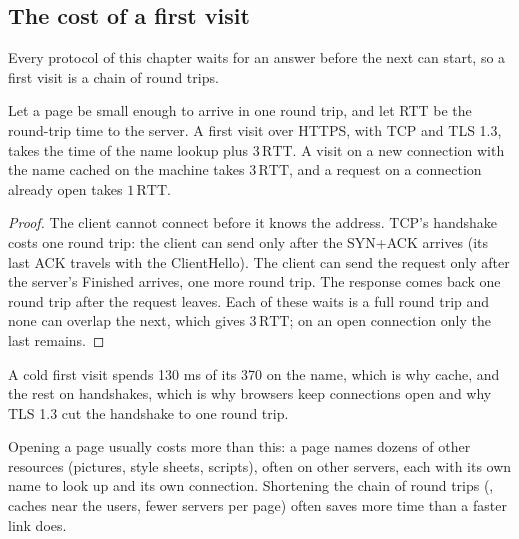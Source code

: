 \subsection{The cost of a first visit}

Every protocol of this chapter waits for an answer before the next can start, so a first visit is a chain of round
trips.

\begin{proposition}\label{prop:b2:application-layer:round-trips}
Let a page be small enough to arrive in one round trip, and let RTT be the round-trip time to the server. A first
visit over HTTPS, with TCP and TLS 1.3, takes the time of the name lookup plus $3\,\mathrm{RTT}$. A visit on a new
connection with the name cached on the machine takes $3\,\mathrm{RTT}$, and a request on a connection already open
takes $1\,\mathrm{RTT}$.
\end{proposition}

\begin{proof}
The client cannot connect before it knows the address. TCP's handshake costs one round trip: the client can send only
after the SYN+ACK arrives (its last ACK travels with the ClientHello). The client can send the request only after the
server's Finished arrives, one more round trip. The response comes back one round trip after the request leaves. Each
of these waits is a full round trip and none can overlap the next, which gives $3\,\mathrm{RTT}$; on an open
connection only the last remains.
\end{proof}

\label{out:b2:application-layer:budget}

A cold first visit spends 130 ms of its 370 on the name, which is why  cache, and the rest on handshakes,
which is why browsers keep connections open and why TLS 1.3 cut the handshake to one round trip.

\begin{inpractice}
Opening a page usually costs more than this: a page names dozens of other resources (pictures, style sheets,
scripts), often on other servers, each with its own name to look up and its own connection. Shortening the chain of
round trips (, caches near the users, fewer servers per page) often saves more time than a faster
link does.
\end{inpractice}

